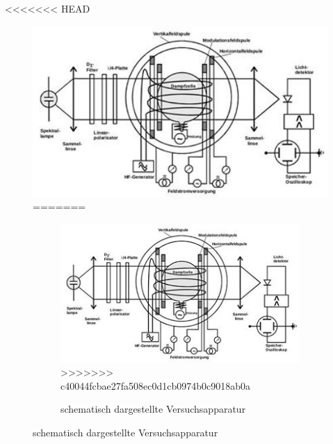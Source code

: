 <<<<<<< HEAD
 \begin{figure}[H]
	\centering
	\includegraphics[width=12cm]{aufbau.jpg}
=======
 \begin{figure}[H]
	\centering
	\includegraphics[width=12cm]{aufbau.jpg}
>>>>>>> c40044fcbae27fa508ec0d1cb0974b0c9018ab0a
	\caption{schematisch dargestellte Versuchsapparatur \cite{V21}}
	\label{abb:aufbau}
\end{figure}


\end{figure}
